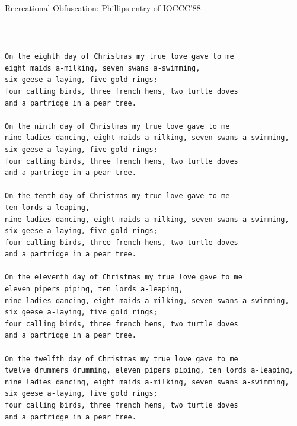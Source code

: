 \begin{frame}[fragile]{Recreational Obfuscation: Phillips entry of IOCCC'88}
\begin{minipage}{.5\linewidth}
\begin{Verbatim}[fontsize=\tiny,frame=single,label=Output]
  \end{Verbatim}    
  \end{minipage}~\begin{minipage}{.5\linewidth}
  \begin{Verbatim}[fontsize=\tiny,frame=single,label=Output (cont)]
On the eighth day of Christmas my true love gave to me
eight maids a-milking, seven swans a-swimming,
six geese a-laying, five gold rings;
four calling birds, three french hens, two turtle doves
and a partridge in a pear tree.

On the ninth day of Christmas my true love gave to me
nine ladies dancing, eight maids a-milking, seven swans a-swimming,
six geese a-laying, five gold rings;
four calling birds, three french hens, two turtle doves
and a partridge in a pear tree.

On the tenth day of Christmas my true love gave to me
ten lords a-leaping,
nine ladies dancing, eight maids a-milking, seven swans a-swimming,
six geese a-laying, five gold rings;
four calling birds, three french hens, two turtle doves
and a partridge in a pear tree.

On the eleventh day of Christmas my true love gave to me
eleven pipers piping, ten lords a-leaping,
nine ladies dancing, eight maids a-milking, seven swans a-swimming,
six geese a-laying, five gold rings;
four calling birds, three french hens, two turtle doves
and a partridge in a pear tree.

On the twelfth day of Christmas my true love gave to me
twelve drummers drumming, eleven pipers piping, ten lords a-leaping,
nine ladies dancing, eight maids a-milking, seven swans a-swimming,
six geese a-laying, five gold rings;
four calling birds, three french hens, two turtle doves
and a partridge in a pear tree.
  \end{Verbatim}
\end{minipage}
\end{frame}
